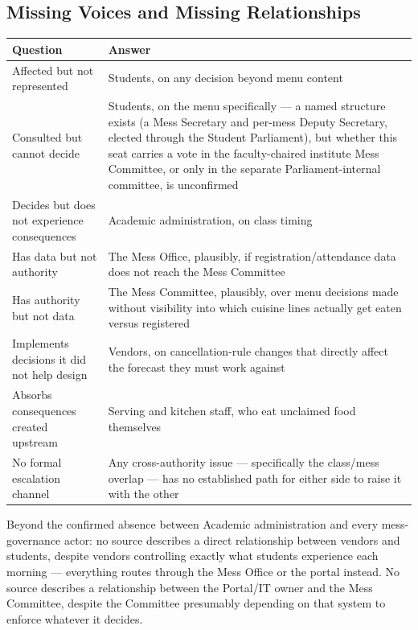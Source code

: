 \documentclass[11pt]{article}
\begin{document}
\subsection{Missing Voices and Missing Relationships}

{\small\setlength{\tabcolsep}{4pt}
\begin{longtable}{L{0.28\textwidth}L{0.62\textwidth}}
\toprule
\textbf{Question} & \textbf{Answer} \\
\midrule
\endhead
Affected but not represented & Students, on any decision beyond menu content \\[4pt]
Consulted but cannot decide & Students, on the menu specifically --- a named
structure exists (a Mess Secretary and per-mess Deputy Secretary, elected through
the Student Parliament), but whether this seat carries a vote in the faculty-chaired
institute Mess Committee, or only in the separate Parliament-internal committee, is
unconfirmed \\[4pt]
Decides but does not experience consequences & Academic administration, on class
timing \\[4pt]
Has data but not authority & The Mess Office, plausibly, if registration/attendance
data does not reach the Mess Committee \\[4pt]
Has authority but not data & The Mess Committee, plausibly, over menu decisions made
without visibility into which cuisine lines actually get eaten versus registered \\[4pt]
Implements decisions it did not help design & Vendors, on cancellation-rule changes
that directly affect the forecast they must work against \\[4pt]
Absorbs consequences created upstream & Serving and kitchen staff, who eat unclaimed
food themselves \\[4pt]
No formal escalation channel & Any cross-authority issue --- specifically the
class/mess overlap --- has no established path for either side to raise it with the
other \\
\bottomrule
\end{longtable}}

Beyond the confirmed absence between Academic administration and every
mess-governance actor: no source describes a direct relationship between vendors and
students, despite vendors controlling exactly what students experience each morning
--- everything routes through the Mess Office or the portal instead. No source
describes a relationship between the Portal/IT owner and the Mess Committee, despite
the Committee presumably depending on that system to enforce whatever it decides.
\end{document}
